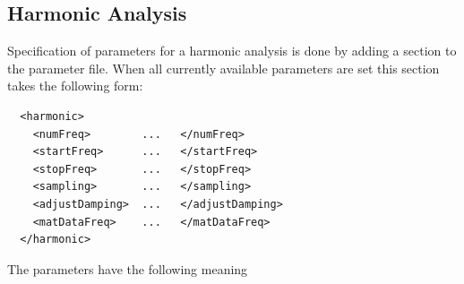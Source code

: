 \subsection{Harmonic Analysis}
%
Specification of parameters for a harmonic analysis is done by adding a
 section to the parameter file. When all currently available
parameters are set this section takes the following form:
%
%
\begin{verbatim}
  <harmonic>
    <numFreq>        ...   </numFreq>
    <startFreq>      ...   </startFreq>
    <stopFreq>       ...   </stopFreq>
    <sampling>       ...   </sampling>
    <adjustDamping>  ...   </adjustDamping>
    <matDataFreq>    ...   </matDataFreq>
  </harmonic>
\end{verbatim}
%
%
The parameters have the following meaning
%
%
